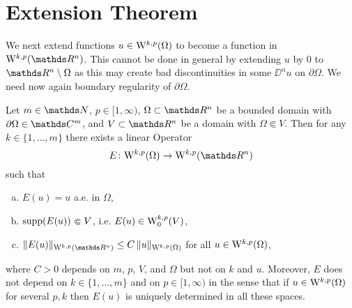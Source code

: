 \section{Extension Theorem}

We next extend functions $u \in \mathrm{W}^{k,p}(\Omega)$ to become a function in $\WW^{k,p}(\R^n)$.
This cannot be done in general by extending $u$ by $0$ to $\R^n \setminus \Omega$ as this may create bad discontinuities in some $\DD^\alpha u$ on $\partial\Omega$.
We need now again boundary regularity of $\partial\Omega$.

\begin{thm}  
  \label{thm:extension}
  Let $m \in \N$, $p \in [1,\infty)$, $\Omega \subset \R^n$ be a bounded domain with $\partial \Omega \in \C^m$, and $V \subset \R^n$ be a domain with $\Omega \Subset V$.
  Then for any $k \in \{1,\dots,m\}$ there exists a linear Operator
  $$
  E \colon \WW^{k,p}(\Omega) \to \WW^{k,p}(\R^n)
  $$
  such that
  \begin{enumerate}[a)]
    \item $E(u) = u$ a.e. in $\Omega$,
    \item $\operatorname{supp}(E(u)) \Subset V$, i.e. $E(u) \in \mathrm{W}_0^{k,p}(V)$,
    \item $\|E(u)\|_{\WW^{k,p}(\R^n)} \leq C \, \| u\|_{\WW^{k,p}(\Omega)}$ for all $u \in \mathrm{W}^{k,p}(\Omega)$,
  \end{enumerate}
  where $C > 0$ depends on $m$, $p$, $V$, and $\Omega$ but not on $k$ and $u$.
  Moreover, $E$ does not depend on $k \in\{1,\dots,m\}$ and on $p \in [1,\infty)$ in the sense that if $u \in \mathrm{W}^{k,p}(\Omega)$ for several $p,k$ then $E(u)$ is uniquely determined in all these spaces.
\end{thm}

